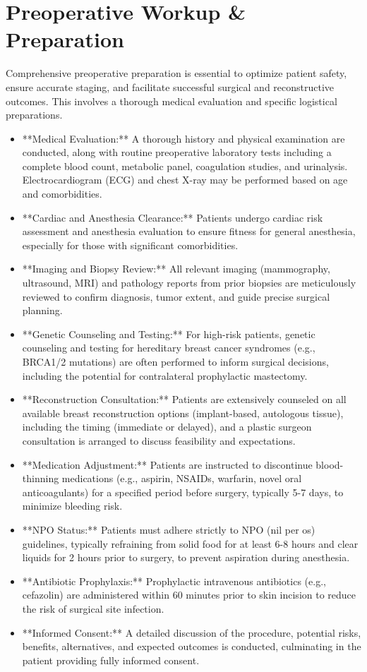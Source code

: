 \section*{Preoperative Workup \& Preparation}
Comprehensive preoperative preparation is essential to optimize patient safety, ensure accurate staging, and facilitate successful surgical and reconstructive outcomes. This involves a thorough medical evaluation and specific logistical preparations.

\begin{itemize}
  \item **Medical Evaluation:** A thorough history and physical examination are conducted, along with routine preoperative laboratory tests including a complete blood count, metabolic panel, coagulation studies, and urinalysis. Electrocardiogram (ECG) and chest X-ray may be performed based on age and comorbidities.
  \item **Cardiac and Anesthesia Clearance:** Patients undergo cardiac risk assessment and anesthesia evaluation to ensure fitness for general anesthesia, especially for those with significant comorbidities.
  \item **Imaging and Biopsy Review:** All relevant imaging (mammography, ultrasound, MRI) and pathology reports from prior biopsies are meticulously reviewed to confirm diagnosis, tumor extent, and guide precise surgical planning.
  \item **Genetic Counseling and Testing:** For high-risk patients, genetic counseling and testing for hereditary breast cancer syndromes (e.g., BRCA1/2 mutations) are often performed to inform surgical decisions, including the potential for contralateral prophylactic mastectomy.
  \item **Reconstruction Consultation:** Patients are extensively counseled on all available breast reconstruction options (implant-based, autologous tissue), including the timing (immediate or delayed), and a plastic surgeon consultation is arranged to discuss feasibility and expectations.
  \item **Medication Adjustment:** Patients are instructed to discontinue blood-thinning medications (e.g., aspirin, NSAIDs, warfarin, novel oral anticoagulants) for a specified period before surgery, typically 5-7 days, to minimize bleeding risk.
  \item **NPO Status:** Patients must adhere strictly to NPO (nil per os) guidelines, typically refraining from solid food for at least 6-8 hours and clear liquids for 2 hours prior to surgery, to prevent aspiration during anesthesia.
  \item **Antibiotic Prophylaxis:** Prophylactic intravenous antibiotics (e.g., cefazolin) are administered within 60 minutes prior to skin incision to reduce the risk of surgical site infection.
  \item **Informed Consent:** A detailed discussion of the procedure, potential risks, benefits, alternatives, and expected outcomes is conducted, culminating in the patient providing fully informed consent.
\end{itemize}

